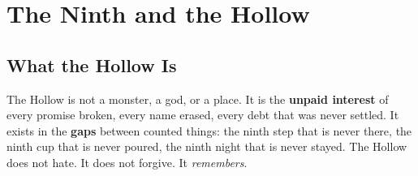 \documentclass[11pt,letterpaper,twoside]{book}
\begin{document}


















\newpage

\appendix
\section*{The Ninth and the Hollow}

\subsection*{What the Hollow Is}

The Hollow is not a monster, a god, or a place. It is the \textbf{unpaid interest} of every promise broken, every name erased, every debt that was never settled. It exists in the \textbf{gaps} between counted things: the ninth step that is never there, the ninth cup that is never poured, the ninth night that is never stayed. The Hollow does not hate. It does not forgive. It \textit{remembers}.
\end{document}
